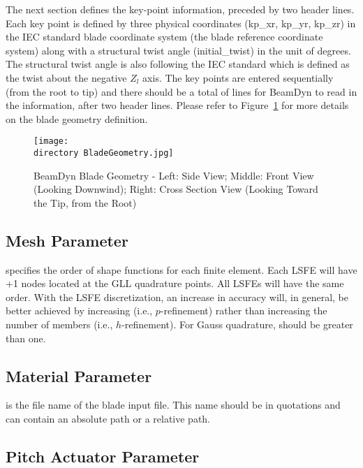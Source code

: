 The next section defines the key-point information, preceded by two header lines. 
Each key point is defined by three physical coordinates (kp\_xr, kp\_yr, kp\_zr) in the IEC standard blade coordinate system (the blade reference coordinate system) along with a structural twist angle (initial\_twist) in the unit of degrees. 
The structural twist angle is also following the IEC standard which is defined as the twist about the negative $Z_l$ axis. 
The key points are entered sequentially (from the root to tip) and there should be a total of  lines for BeamDyn to read in the information, after two header lines. Please refer to Figure~\ref{fig:BladeGeometry} for more details on the blade geometry definition.
\begin{figure}[h!tp]
    \centering
    \texttt{[image: \\directory BladeGeometry.jpg]}
    \caption{BeamDyn Blade Geometry - Left: Side View; Middle: Front View (Looking Downwind); Right: Cross Section View (Looking Toward the Tip, from the Root)
}
    \label{fig:BladeGeometry}
\end{figure}

\subsection{Mesh Parameter}

 specifies the order of shape functions for each finite element.  
Each LSFE will have +1 nodes located at the GLL quadrature points.
All LSFEs will have the same order.
With the LSFE discretization, an increase in accuracy will, in general, be better achieved by increasing  (i.e., $p$-refinement) rather than increasing the number of members (i.e., $h$-refinement).
For Gauss quadrature,  should be greater than one. 

\subsection{Material Parameter}

 is the file name of the blade input file. 
This name should be in quotations and can contain an absolute path or a relative path.

\subsection{Pitch Actuator Parameter}

